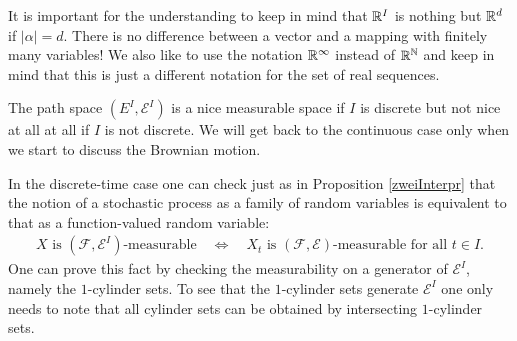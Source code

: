 		It is important for the understanding to keep in mind that $\mathbb{R}^I$ is nothing but $\mathbb{R}^d$ if $|\alpha|=d$. There is no difference between a vector and a mapping with finitely many variables! We also like to use the notation $\mathbb{R}^\infty$ instead of $\mathbb{R}^{\mathbb{N}}$ and keep in mind that this is just a different notation for the set of real sequences. 
\begin{lwarnhinweis}
		The path space $(E^I,\mathcal E^I)$ is a nice measurable space if $I$ is discrete but not nice at all at all if $I$ is not discrete. We will get back to the continuous case only when we start to discuss the Brownian motion. 
\end{lwarnhinweis}
	In the discrete-time case one can check just as in Proposition \ref{zweiInterpr} that the notion of a stochastic process as a family of random variables is equivalent to that as a function-valued random variable:
	\begin{align*}
		X \text{ is }(\mathcal F,\mathcal E^I)\text{-measurable}\quad \Leftrightarrow\quad X_t \text{ is } (\mathcal F,\mathcal E)\text{-measurable for all }t\in I.
	\end{align*}	
	One can prove this fact by checking the measurability on a generator of $\mathcal E^I$, namely the $1$-cylinder sets. To see that the $1$-cylinder sets generate $\mathcal E^I$ one only needs to note that all cylinder sets can be obtained by intersecting $1$-cylinder sets.\smallskip


